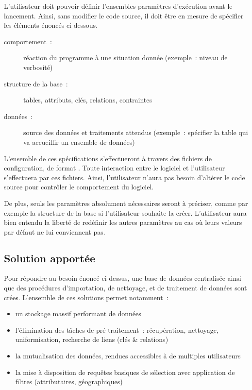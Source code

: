 \documentclass[french,12pt]{article}
\begin{document}
L'utilisateur doit pouvoir définir l'ensembles paramètres d'exécution avant le lancement. Ainsi, sans modifier le code source, il doit être en mesure de spécifier les éléments énoncés ci-dessous.

\begin{description}
  \item[comportement~:] réaction du programme à une situation donnée (exemple~: niveau de verbosité)
  \item[structure de la base~:] tables, attributs, clés, relations, contraintes
  \item[données~:] source des données et traitements attendus (exemple~: spécifier la table qui va accueillir un ensemble de données)
\end{description}

L'ensemble de ces spécifications s'effectueront à travers des fichiers de configuration, de format . Toute interaction entre le logiciel et l'utilisateur s'effectuera par ces fichiers. Ainsi, l'utilisateur n'aura pas besoin d'altérer le code source pour contrôler le comportement du logiciel.

De plus, seuls les paramètres absolument nécessaires seront à préciser, comme par exemple la structure de la base si l'utilisateur souhaite la créer. L'utilisateur aura bien entendu la liberté de redéfinir les autres paramètres au cas où leurs valeurs par défaut ne lui conviennent pas.

\subsection{Solution apportée}

Pour répondre au besoin énoncé ci-dessus, une base de données centralisée ainsi que des procédures d'importation, de nettoyage, et de traitement de données sont crées. L'ensemble de ces solutions permet notamment~:

\begin{itemize}
  \item un stockage massif performant de données
  \item l'élimination des tâches de pré-traitement~: récupération, nettoyage, uniformisation, recherche de liens (clés \& relations)
  \item la mutualisation des données, rendues accessibles à de multiples utilisateurs
  \item la mise à disposition de requêtes basiques de sélection avec application de filtres (attributaires, géographiques)
\end{itemize}
\end{document}
